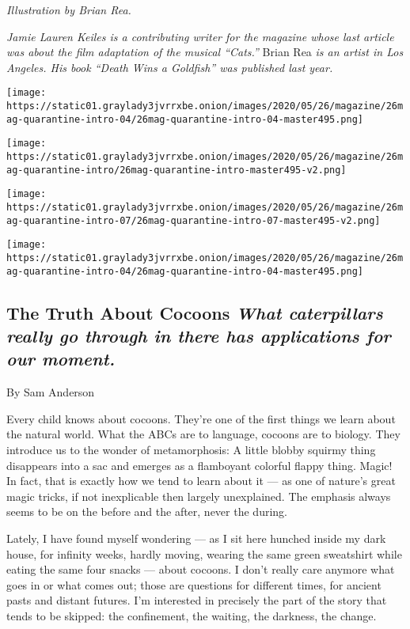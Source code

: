 \emph{Illustration by Brian Rea.}

\emph{Jamie Lauren Keiles is a contributing writer for the magazine
whose last article was about the film adaptation of the musical
``Cats.''} Brian Rea \emph{is an artist in Los Angeles. His book ``Death
Wins a Goldfish'' was published last year.}

\texttt{[image: https://static01.graylady3jvrrxbe.onion/images/2020/05/26/magazine/26mag-quarantine-intro-04/26mag-quarantine-intro-04-master495.png]}

\texttt{[image: https://static01.graylady3jvrrxbe.onion/images/2020/05/26/magazine/26mag-quarantine-intro/26mag-quarantine-intro-master495-v2.png]}

\texttt{[image: https://static01.graylady3jvrrxbe.onion/images/2020/05/26/magazine/26mag-quarantine-intro-07/26mag-quarantine-intro-07-master495-v2.png]}

\texttt{[image: https://static01.graylady3jvrrxbe.onion/images/2020/05/26/magazine/26mag-quarantine-intro-04/26mag-quarantine-intro-04-master495.png]}

\hypertarget{the-truth-about-cocoons-what-caterpillars-really-go-through-in-there-has-applications-for-our-moment}{%
\subsection{\texorpdfstring{The Truth About Cocoons \emph{What
caterpillars really go through in there has applications for our
moment.}}{The Truth About Cocoons What caterpillars really go through in there has applications for our moment.}}\label{the-truth-about-cocoons-what-caterpillars-really-go-through-in-there-has-applications-for-our-moment}}

By Sam Anderson

Every child knows about cocoons. They're one of the first things we
learn about the natural world. What the ABCs are to language, cocoons
are to biology. They introduce us to the wonder of metamorphosis: A
little blobby squirmy thing disappears into a sac and emerges as a
flamboyant colorful flappy thing. Magic! In fact, that is exactly how we
tend to learn about it --- as one of nature's great magic tricks, if not
inexplicable then largely unexplained. The emphasis always seems to be
on the before and the after, never the during.

Lately, I have found myself wondering --- as I sit here hunched inside
my dark house, for infinity weeks, hardly moving, wearing the same green
sweatshirt while eating the same four snacks --- about cocoons. I don't
really care anymore what goes in or what comes out; those are questions
for different times, for ancient pasts and distant futures. I'm
interested in precisely the part of the story that tends to be skipped:
the confinement, the waiting, the darkness, the change.

